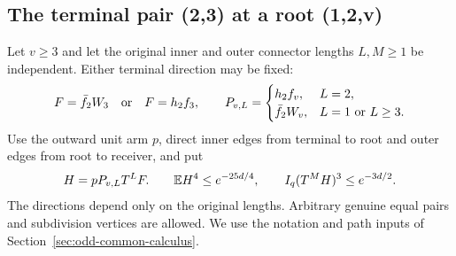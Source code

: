 \subsection{The terminal pair (2,3) at a root (1,2,v)}
\label{proof:Q5-C168}

Let \(v\ge3\) and let the original inner and outer connector lengths
\(L,M\ge1\) be independent. Either terminal direction may be fixed:
\begin{equation}\label{eq:odd168:directions}
 F=\bar f_2W_3\quad\hbox{or}\quad F=h_2f_3,
 \qquad
 P_{v,L}=\begin{cases}h_2f_v,&L=2,\\
                       \bar f_2W_v,&L=1\text{ or }L\ge3.
          \end{cases}
\end{equation}
Use the outward unit arm \(p\), direct inner edges from terminal to
root and outer edges from root to receiver, and put
\begin{equation}\label{eq:odd168:statement}
 H=pP_{v,L}T^LF.
 \qquad
 \mathbb E H^4\le e^{-25d/4},\qquad
 I_q(T^MH)^3\le e^{-3d/2}.
\end{equation}
The directions depend only on the original lengths. Arbitrary genuine
equal pairs and subdivision vertices are allowed. We use the notation
and path inputs of Section~\ref{sec:odd-common-calculus}.

